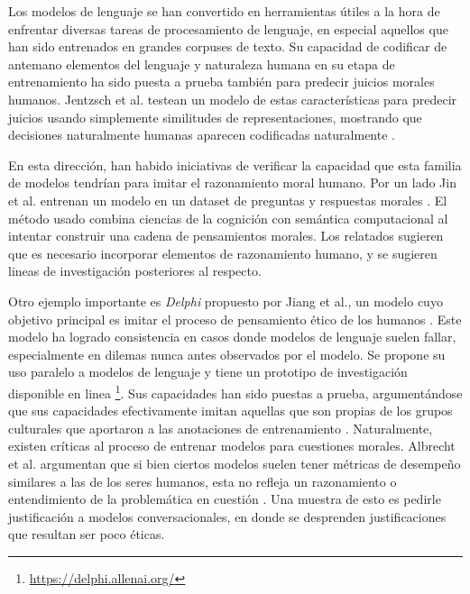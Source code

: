 \documentclass[
	spanish, %
	letterpaper, oneside
]{article}
\begin{document}

Los modelos de lenguaje se han convertido en herramientas útiles a la hora de enfrentar diversas tareas de procesamiento de lenguaje, en especial aquellos que han sido entrenados en grandes corpuses de texto. Su capacidad de codificar de antemano elementos del lenguaje y naturaleza humana en su etapa de entrenamiento ha sido puesta a prueba también para predecir juicios morales humanos. Jentzsch et al. testean un modelo de estas características para predecir juicios usando simplemente similitudes de representaciones, mostrando que decisiones naturalmente humanas aparecen codificadas naturalmente \cite{use}.

\newp En esta dirección, han habido iniciativas de verificar la capacidad que esta familia de modelos tendrían para imitar el razonamiento moral humano. Por un lado Jin et al. entrenan un modelo en un dataset de preguntas y respuestas morales \cite{Jin}. El método usado combina ciencias de la cognición con semántica computacional al intentar construir una cadena de pensamientos morales. Los relatados sugieren que es necesario incorporar elementos de razonamiento humano, y se sugieren lineas de investigación posteriores al respecto.

\newp Otro ejemplo importante es \textit{Delphi} propuesto por Jiang et al., un modelo cuyo objetivo principal es imitar el proceso de pensamiento ético de los humanos \cite{Jiang}. Este modelo ha logrado consistencia en casos donde modelos de lenguaje suelen fallar, especialmente en dilemas nunca antes observados por el modelo. Se propone su uso paralelo a modelos de lenguaje y tiene un prototipo de investigación disponible en linea \footnote{\url{https://delphi.allenai.org/}}. Sus capacidades han sido puestas a prueba, argumentándose que sus capacidades efectivamente imitan aquellas que son propias de los grupos culturales que aportaron a las anotaciones de entrenamiento \cite{Fraser}. Naturalmente, existen críticas al proceso de entrenar modelos para cuestiones morales. Albrecht et al. argumentan que si bien ciertos modelos suelen tener métricas de desempeño similares a las de los seres humanos, esta no refleja un razonamiento o entendimiento de la problemática en cuestión \cite{Albrecht}. Una muestra de esto es pedirle justificación a modelos conversacionales, en donde se desprenden justificaciones que resultan ser poco éticas.


\end{document}
